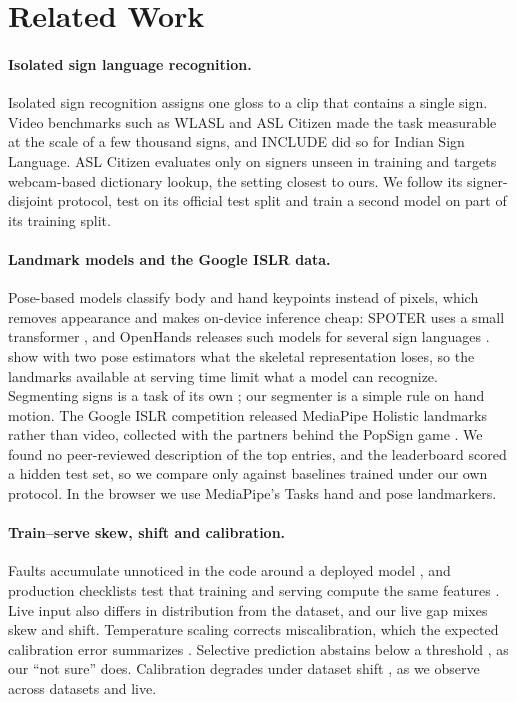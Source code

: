 \section{Related Work}
\label{sec:related}

\paragraph{Isolated sign language recognition.}
Isolated sign recognition assigns one gloss to a clip that contains a single sign. Video
benchmarks such as WLASL \citep{li2020wlasl} and ASL Citizen \citep{desai2023aslcitizen} made the
task measurable at the scale of a few thousand signs, and INCLUDE \citep{sridhar2020include} did so
for Indian Sign Language. ASL Citizen evaluates only on signers unseen in training and targets
webcam-based dictionary lookup, the setting closest to ours. We follow its signer-disjoint
protocol, test on its official test split and train a second model on part of its training split.

\paragraph{Landmark models and the Google ISLR data.}
Pose-based models classify body and hand keypoints instead of pixels, which removes appearance and
makes on-device inference cheap: SPOTER uses a small transformer \citep{bohacek2022spoter}, and
OpenHands releases such models for several sign languages \citep{selvaraj2022openhands}.
\citet{moryossef2021pose} show with two pose estimators what the skeletal representation loses,
so the landmarks available at serving time limit what a model can recognize. Segmenting signs is a
task of its own \citep{renz2021segmentation}; our segmenter is a simple rule on hand motion. The
Google ISLR competition \citep{kaggle2023islr} released MediaPipe Holistic landmarks rather than
video, collected with the partners behind the PopSign game \citep{starner2023popsign}. We found no
peer-reviewed description of the top entries, and the leaderboard scored a hidden test set, so we
compare only against baselines trained under our own protocol. In the browser we use MediaPipe's
Tasks hand \citep{zhang2020mediapipehands} and pose \citep{bazarevsky2020blazepose} landmarkers.

\paragraph{Train--serve skew, shift and calibration.}
Faults accumulate unnoticed in the code around a deployed model \citep{sculley2015debt}, and
production checklists test that training and serving compute the same features
\citep{breck2017mltestscore}. Live input also differs in distribution from the dataset, and our
live gap mixes skew and shift. Temperature scaling corrects miscalibration, which the expected
calibration error summarizes \citep{guo2017calibration}. Selective prediction abstains below a
threshold \citep{geifman2017selective}, as our ``not sure'' does. Calibration degrades under
dataset shift \citep{ovadia2019shift}, as we observe across datasets and live.


